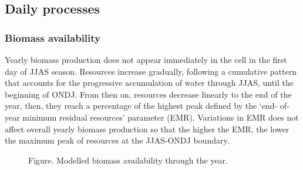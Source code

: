 \documentclass[11pt,oneside,a4paper,openright]{report}
\begin{document}
\subsection{Daily processes}

\subsubsection{Biomass availability}
Yearly biomass production does not appear immediately in the cell in the first day of JJAS season.
Resources increase gradually, following a cumulative pattern that accounts for the progressive
accumulation of water through JJAS, until the beginning of ONDJ. From then on, resources decrease
linearly to the end of the year, then, they reach a percentage of the highest peak defined by the ‘end-
of-year minimum residual resources’ parameter (EMR). Variations in EMR does not affect overall
yearly biomass production so that the higher the EMR, the lower the maximum peak of resources at
the JJAS-ONDJ boundary.


\begin{figure}[h]
\centering
\setlength\fboxsep{0pt}
\setlength\fboxrule{0.5pt}
\caption{Figure. Modelled biomass availability through the year.}
\label{fig:resourceGrowing}
\end{figure}
\end{document}
